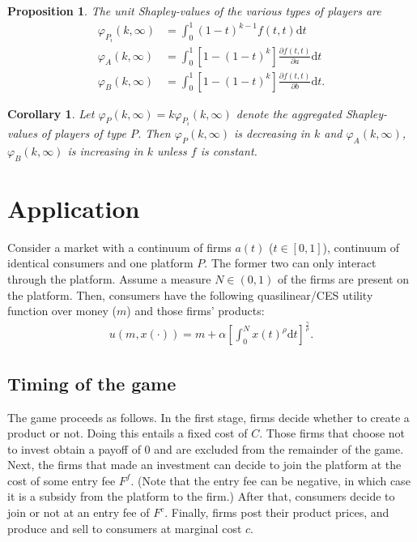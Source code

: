 \documentclass[a4paper]{article}
\newtheorem{proposition}{Proposition}
\newtheorem{corollary}{Corollary}
\newcommand{\dt}{\mathrm{d}t}
\begin{document}
\begin{proposition}
    The unit Shapley-values of the various types of players are
    \begin{align*}
        \varphi_{P_i}(k, \infty) & = \int_0^1 (1-t)^{k-1} f(t, t) \dt                                 \\
        \varphi_A(k, \infty)     & = \int_0^1 [1 - (1-t)^k] \frac{\partial f(t, t)}{\partial a} \dt   \\
        \varphi_B(k, \infty)     & = \int_0^1 [1 - (1-t)^k] \frac{\partial f(t, t)}{\partial b} \dt .
    \end{align*}
\end{proposition}

\begin{corollary}
    Let $\varphi_{P}(k, \infty) = k\varphi_{P_i}(k, \infty)$ denote the aggregated Shapley-values of players of type $P$. Then $\varphi_{P}(k, \infty)$ is decreasing in $k$ and $\varphi_{A}(k, \infty)$, $\varphi_{B}(k, \infty)$ is increasing in $k$ unless $f$ is constant.
\end{corollary}


\section{Application}

Consider a market with a continuum of firms $a(t)$ ($t \in [0, 1]$), continuum of identical consumers and one platform $P$. The former two can only interact through the platform. Assume a measure $N \in (0, 1)$ of the firms are present on the platform. Then, consumers have the following quasilinear/CES utility function over money ($m$) and those firms' products:
\begin{align*}
    u(m, x(\cdot)) = m + \alpha \left[ \int_0^N x(t)^\rho \dt \right] ^ \frac{\gamma}{\rho}.
\end{align*}

\subsection{Timing of the game}

The game proceeds as follows. In the first stage, firms decide whether to create a product or not. Doing this entails a fixed cost of $C$. Those firms that choose not to invest obtain a payoff of 0 and are excluded from the remainder of the game. Next, the firms that made an investment can decide to join the platform at the cost of some entry fee $F^f$. (Note that the entry fee can be negative, in which case it is a subsidy from the platform to the firm.) After that, consumers decide to join or not at an entry fee of $F^c$. Finally, firms post their product prices, and produce and sell to consumers at marginal cost $c$.
\end{document}
